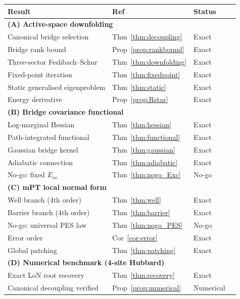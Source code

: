 \documentclass[12pt]{article}
\theoremstyle{plain}
\theoremstyle{definition}
\numberwithin{equation}{section}
\begin{document}
\begin{center}
\begin{tabular}{p{5.5cm}lll}
\toprule
Result & Ref & Status\\
\midrule
\multicolumn{3}{l}{\textbf{(A) Active-space downfolding}}\\
\quad Canonical bridge selection & Thm~\ref{thm:decoupling} & Exact\\
\quad Bridge rank bound & Prop~\ref{prop:rankbound} & Exact\\
\quad Three-sector Feshbach--Schur & Thm~\ref{thm:downfolding} & Exact\\
\quad Fixed-point iteration & Thm~\ref{thm:fixedpoint} & Exact\\
\quad Static generalised eigenproblem & Thm~\ref{thm:static} & Exact\\
\quad Energy derivative & Prop~\ref{prop:Rstar} & Exact\\
\midrule
\multicolumn{3}{l}{\textbf{(B) Bridge covariance functional}}\\
\quad Log-marginal Hessian & Thm~\ref{thm:hessian} & Exact\\
\quad Path-integrated functional & Thm~\ref{thm:functional} & Exact\\
\quad Gaussian bridge kernel & Thm~\ref{thm:gaussian} & Exact\\
\quad Adiabatic connection & Thm~\ref{thm:adiabatic} & Exact\\
\quad No-go: fixed $E_{xc}$ & Thm~\ref{thm:nogo_Exc} & No-go\\
\midrule
\multicolumn{3}{l}{\textbf{(C) mPT local normal form}}\\
\quad Well branch (4th order) & Thm~\ref{thm:well} & Exact\\
\quad Barrier branch (4th order) & Thm~\ref{thm:barrier} & Exact\\
\quad No-go: universal PES law & Thm~\ref{thm:nogo_PES} & No-go\\
\quad Error order & Cor~\ref{cor:error} & Exact\\
\quad Global patching & Thm~\ref{thm:patching} & Exact\\
\midrule
\multicolumn{3}{l}{\textbf{(D) Numerical benchmark (4-site Hubbard)}}\\
\quad Exact LoN root recovery & Thm~\ref{thm:recovery} & Exact\\
\quad Canonical decoupling verified & Prop~\ref{prop:numerical} & Numerical\\
\bottomrule
\end{tabular}
\end{center}
\end{document}
